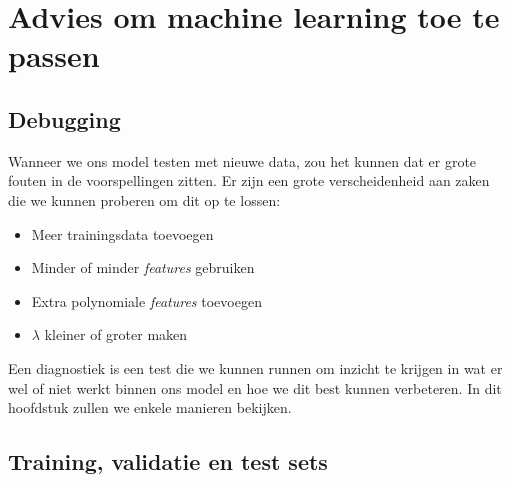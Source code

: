 \section{Advies om machine learning toe te passen}

\subsection{Debugging}

Wanneer we ons model testen met nieuwe data, zou het kunnen dat er grote fouten in de voorspellingen zitten. Er zijn een grote verscheidenheid aan zaken die we kunnen proberen om dit op te lossen:
\begin{itemize}
	\item Meer trainingsdata toevoegen
	\item Minder of minder \textit{features} gebruiken
	\item Extra polynomiale \textit{features} toevoegen
	\item $\lambda$ kleiner of groter maken
\end{itemize}
\noindent
Een diagnostiek is een test die we kunnen runnen om inzicht te krijgen in wat er wel of niet werkt binnen ons model en hoe we dit best kunnen verbeteren. In dit hoofdstuk zullen we enkele manieren bekijken. 

\subsection{Training, validatie en test sets}

